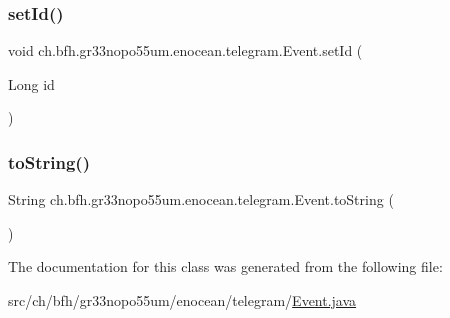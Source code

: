 \hypertarget{classch_1_1bfh_1_1gr33nopo55um_1_1enocean_1_1telegram_1_1_event_a55da00c4e15b94edb99b290cfb485681}{}\label{classch_1_1bfh_1_1gr33nopo55um_1_1enocean_1_1telegram_1_1_event_a55da00c4e15b94edb99b290cfb485681} 
\subsubsection{\texorpdfstring{set\+Id()}{setId()}}
{\footnotesize\ttfamily void ch.\+bfh.\+gr33nopo55um.\+enocean.\+telegram.\+Event.\+set\+Id (\begin{DoxyParamCaption}\item[{Long}]{id }\end{DoxyParamCaption})}

\hypertarget{classch_1_1bfh_1_1gr33nopo55um_1_1enocean_1_1telegram_1_1_event_a1fcbbe38ef10bdea233d4c6886add169}{}\label{classch_1_1bfh_1_1gr33nopo55um_1_1enocean_1_1telegram_1_1_event_a1fcbbe38ef10bdea233d4c6886add169} 
\subsubsection{\texorpdfstring{to\+String()}{toString()}}
{\footnotesize\ttfamily String ch.\+bfh.\+gr33nopo55um.\+enocean.\+telegram.\+Event.\+to\+String (\begin{DoxyParamCaption}{ }\end{DoxyParamCaption})}



The documentation for this class was generated from the following file\+:\begin{DoxyCompactItemize}
\item 
src/ch/bfh/gr33nopo55um/enocean/telegram/\hyperlink{ch_2bfh_2gr33nopo55um_2enocean_2telegram_2_event_8java}{Event.\+java}\end{DoxyCompactItemize}

